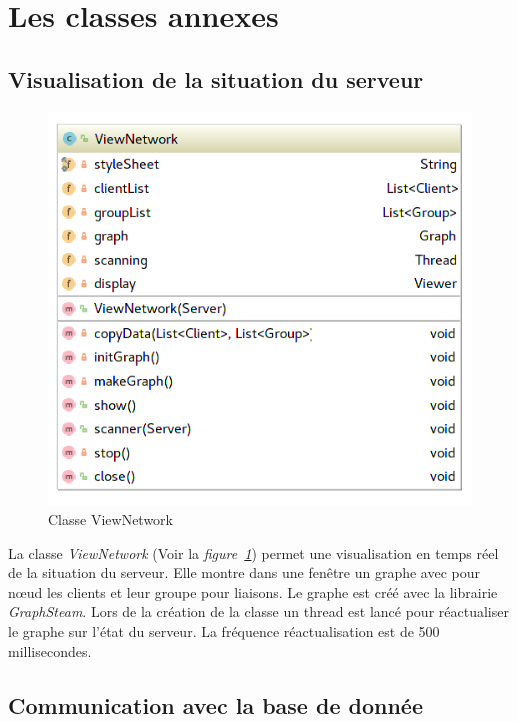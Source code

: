 \documentclass[a4paper,11pt]{report}
\begin{document}
\section{Les classes annexes}

\subsection{Visualisation de la situation du serveur}

    \begin{figure}[th]
      \begin{center}
        \includegraphics[scale=0.4]{Assets/UML_Network.png}
        \caption{Classe ViewNetwork}
        \label{Classe ViewNetwork}
      \end{center}
    \end{figure}
    
    La classe \textit{ViewNetwork} (Voir la \textit{figure~\ref{Classe ViewNetwork}}) permet une visualisation en temps réel de la situation du serveur. Elle montre dans une fenêtre un graphe avec pour nœud les clients et leur groupe pour liaisons. Le graphe est créé avec la librairie \textit{GraphSteam}. Lors de la création de la classe un thread est lancé pour réactualiser le graphe sur l’état du serveur. La fréquence réactualisation est de 500 millisecondes.

\subsection{Communication avec la base de donnée}
\end{document}
